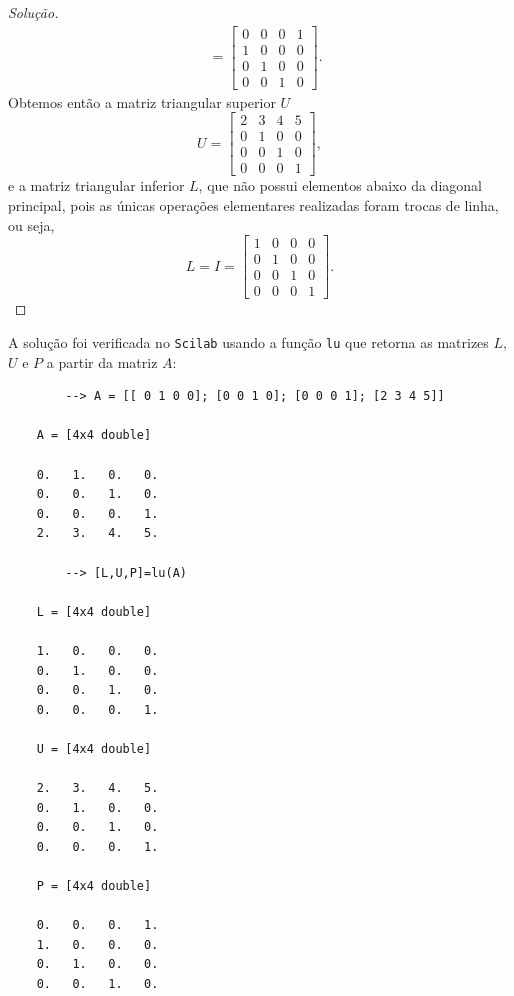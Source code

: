 \documentclass{article}
\begin{document}
\begin{proof}[Solução]
\begin{align}
        &= \begin{bmatrix} 0 & 0 & 0 & 1 \\ 1 & 0 & 0 & 0 \\ 0 & 1 & 0 & 0 \\ 0 & 0 & 1 & 0 \end{bmatrix}.
    \end{align}
    Obtemos então a matriz triangular superior \(U\)
    \begin{equation}
        U = \begin{bmatrix} 2 & 3 & 4 & 5 \\ 0 & 1 & 0 & 0 \\ 0 & 0 & 1 & 0 \\ 0 & 0 & 0 & 1 \end{bmatrix},
    \end{equation}
    e a matriz triangular inferior \(L\), que não possui elementos abaixo da diagonal principal, pois as únicas operações elementares realizadas foram trocas de linha, ou seja,
    \begin{equation}
        L = I = \begin{bmatrix} 1 & 0 & 0 & 0 \\ 0 & 1 & 0 & 0 \\ 0 & 0 & 1 & 0 \\ 0 & 0 & 0 & 1 \end{bmatrix}.
    \end{equation}
\end{proof}

A solução foi verificada no \texttt{Scilab} usando a função \texttt{lu} que retorna as matrizes \(L\), \(U\) e \(P\) a partir da matriz \(A\):
    \begin{verbatim}
        --> A = [[ 0 1 0 0]; [0 0 1 0]; [0 0 0 1]; [2 3 4 5]]

    A = [4x4 double]

    0.   1.   0.   0.
    0.   0.   1.   0.
    0.   0.   0.   1.
    2.   3.   4.   5.

        --> [L,U,P]=lu(A)

    L = [4x4 double]

    1.   0.   0.   0.
    0.   1.   0.   0.
    0.   0.   1.   0.
    0.   0.   0.   1.

    U = [4x4 double]

    2.   3.   4.   5.
    0.   1.   0.   0.
    0.   0.   1.   0.
    0.   0.   0.   1.

    P = [4x4 double]

    0.   0.   0.   1.
    1.   0.   0.   0.
    0.   1.   0.   0.
    0.   0.   1.   0.
    \end{verbatim}
\end{document}
